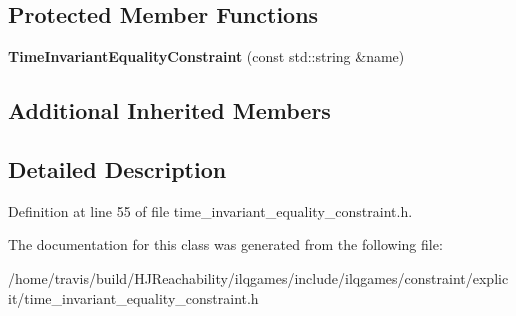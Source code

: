 \subsection*{Protected Member Functions}
\begin{DoxyCompactItemize}
\item 
{\bfseries Time\+Invariant\+Equality\+Constraint} (const std\+::string \&name)\hypertarget{classilqgames_1_1_time_invariant_equality_constraint_a195c8e6000ecc9aedccd52a94ac59501}{}\label{classilqgames_1_1_time_invariant_equality_constraint_a195c8e6000ecc9aedccd52a94ac59501}

\end{DoxyCompactItemize}
\subsection*{Additional Inherited Members}


\subsection{Detailed Description}


Definition at line 55 of file time\+\_\+invariant\+\_\+equality\+\_\+constraint.\+h.



The documentation for this class was generated from the following file\+:\begin{DoxyCompactItemize}
\item 
/home/travis/build/\+H\+J\+Reachability/ilqgames/include/ilqgames/constraint/explicit/time\+\_\+invariant\+\_\+equality\+\_\+constraint.\+h\end{DoxyCompactItemize}
